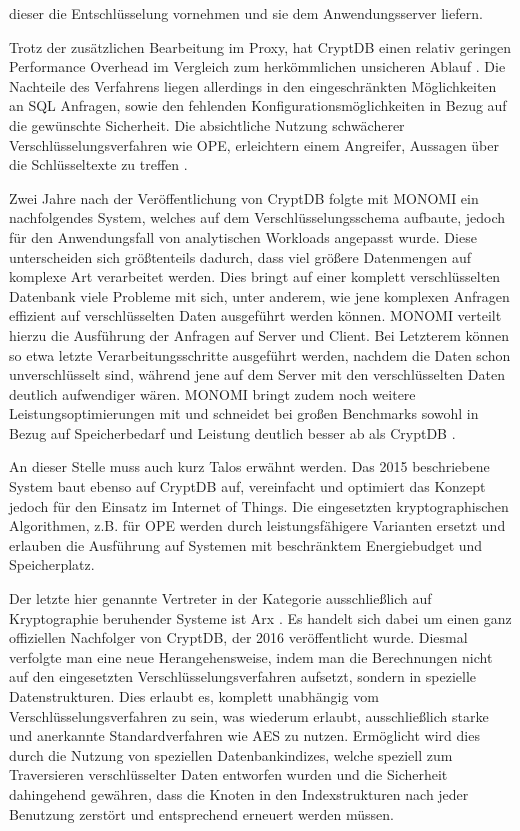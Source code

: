 dieser die Entschlüsselung vornehmen und sie dem Anwendungsserver liefern.

Trotz der zusätzlichen Bearbeitung im Proxy, hat CryptDB einen relativ geringen Performance Overhead im Vergleich zum herkömmlichen unsicheren Ablauf \cite{Popa2012}. Die Nachteile des Verfahrens liegen allerdings in den eingeschränkten Möglichkeiten an SQL Anfragen, sowie den fehlenden Konfigurationsmöglichkeiten in Bezug auf die gewünschte Sicherheit. Die absichtliche Nutzung schwächerer Verschlüsselungsverfahren wie OPE, erleichtern einem Angreifer, Aussagen über die Schlüsseltexte zu treffen \cite{Poddar2016}.

Zwei Jahre nach der Veröffentlichung von CryptDB folgte mit MONOMI \cite{Tu2013} ein nachfolgendes System, welches auf dem Verschlüsselungsschema aufbaute, jedoch für den Anwendungsfall von analytischen Workloads angepasst wurde. Diese unterscheiden sich größtenteils dadurch, dass viel größere Datenmengen auf komplexe Art verarbeitet werden. Dies bringt auf einer komplett verschlüsselten Datenbank viele Probleme mit sich, unter anderem, wie jene komplexen Anfragen effizient auf verschlüsselten Daten ausgeführt werden können. MONOMI verteilt hierzu die Ausführung der Anfragen auf Server und Client. Bei Letzterem können so etwa letzte Verarbeitungsschritte ausgeführt werden, nachdem die Daten schon unverschlüsselt sind, während jene auf dem Server mit den verschlüsselten Daten deutlich aufwendiger wären. MONOMI bringt zudem noch weitere Leistungsoptimierungen mit und schneidet bei großen Benchmarks sowohl in Bezug auf Speicherbedarf und Leistung deutlich besser ab als CryptDB \cite{Tu2013}.

An dieser Stelle muss auch kurz Talos \cite{Shafagh2015} erwähnt werden. Das 2015 beschriebene System baut ebenso auf CryptDB auf, vereinfacht und optimiert das Konzept jedoch für den Einsatz im Internet of Things. Die eingesetzten kryptographischen Algorithmen, z.B. für OPE werden durch leistungsfähigere Varianten ersetzt und erlauben die Ausführung auf Systemen mit beschränktem Energiebudget und Speicherplatz.

Der letzte hier genannte Vertreter in der Kategorie ausschließlich auf Kryptographie beruhender Systeme ist Arx \cite{Poddar2016}. Es handelt sich dabei um einen ganz offiziellen Nachfolger von CryptDB, der 2016 veröffentlicht wurde. Diesmal verfolgte man eine neue Herangehensweise, indem man die Berechnungen nicht auf den eingesetzten Verschlüsselungsverfahren aufsetzt, sondern in spezielle Datenstrukturen. Dies erlaubt es, komplett unabhängig vom Verschlüsselungsverfahren zu sein, was wiederum erlaubt, ausschließlich starke und anerkannte Standardverfahren wie AES zu nutzen. Ermöglicht wird dies durch die Nutzung von speziellen Datenbankindizes, welche speziell zum Traversieren verschlüsselter Daten entworfen wurden und die Sicherheit dahingehend gewähren, dass die Knoten in den Indexstrukturen nach jeder Benutzung zerstört und entsprechend erneuert werden müssen.


